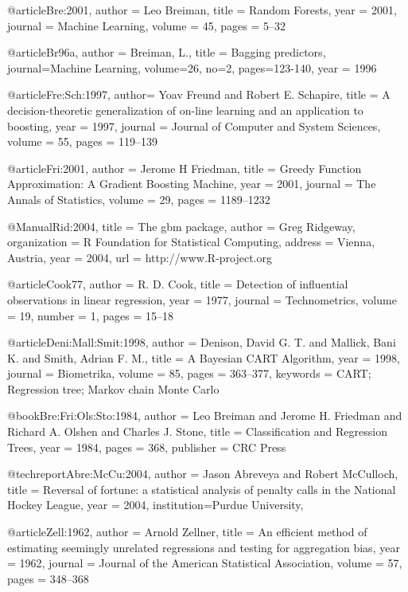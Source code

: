 @article{Bre:2001,
  author = {Leo Breiman},
  title = {Random Forests},
  year = 2001,
  journal = {Machine Learning},
  volume = 45,
  pages = {5--32}
}

@article{Br96a,
   author = {Breiman, L.},
   title = {Bagging predictors},
   journal={Machine Learning},
   volume={26},
   no={2},
   pages={123-140},
   year = 1996}


@article{Fre:Sch:1997,
  author= {Yoav Freund and Robert E. Schapire},
  title = {A decision-theoretic generalization of on-line learning and an application to boosting},
  year = {1997},
  journal = {Journal of Computer and System Sciences},
  volume =  55,
  pages = {119--139}
}

@article{Fri:2001,
  author = {Jerome H Friedman},
  title = {Greedy Function Approximation: A Gradient Boosting Machine},
  year = {2001},
  journal = {The Annals of Statistics},
  volume = 29,
  pages = {1189--1232}
}

     @Manual{Rid:2004,
       title        = {The gbm package},
       author       = {Greg Ridgeway},
       organization = {R Foundation for Statistical Computing},
       address      = {Vienna, Austria},
       year         = 2004,
       url          = {http://www.R-project.org}
     }


@article{Cook77,
    author = {R. D. Cook},
    title = {Detection of influential observations in linear
regression},
    year = {1977},
    journal = {Technometrics},
    volume = {19},
    number = {1},
    pages = {15--18}
}

@article{Deni:Mall:Smit:1998,
    author = {Denison, David G. T. and Mallick, Bani K. and Smith, Adrian F. M.},
    title = {A {B}ayesian {CART} Algorithm},
    year = {1998},
    journal = {Biometrika},
    volume = {85},
    pages = {363--377},
    keywords = {CART; Regression tree; Markov chain Monte Carlo}
}


@book{Bre:Fri:Ols:Sto:1984,
    author = {Leo Breiman and Jerome H. Friedman and Richard A. Olshen
and Charles J. Stone},
    title = {Classification and Regression Trees},
    year = {1984},
    pages = {368},
    publisher = {CRC Press}
}

@techreport{Abre:McCu:2004,
    author = {Jason Abreveya  and Robert McCulloch},
    title = {Reversal of fortune: a statistical analysis of penalty
calls in the {N}ational {H}ockey {L}eague},
    year = 2004,
    institution={Purdue University},
}

@article{Zell:1962,
    author = {Arnold Zellner},
    title = {An efficient method of estimating seemingly unrelated
regressions and testing for aggregation bias},
    year = {1962},
    journal = {Journal of the American Statistical Association},
    volume = {57},
    pages = {348--368}
}


